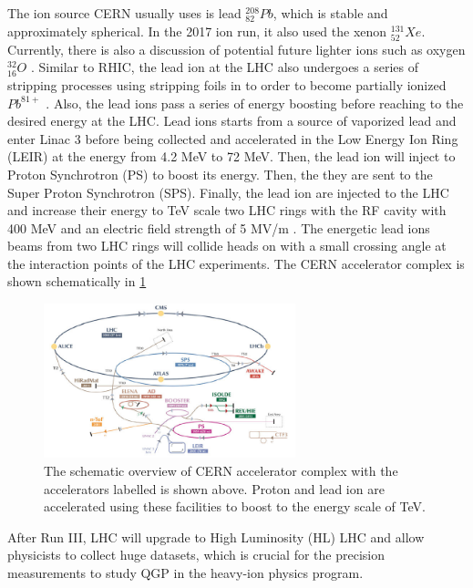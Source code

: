 The ion source CERN usually uses is lead ${}^{208}_{82} Pb$, which is stable and approximately spherical. In the 2017 ion run, it also used the xenon ${}^{131}_{52} Xe$. Currently, there is also a discussion of potential future lighter ions such as oxygen ${}^{32}_{16} O$ \cite{OORun}. Similar to RHIC, the lead ion at the LHC also undergoes a series of stripping processes using stripping foils in to order to become partially ionized $Pb^{81+}$ \cite{LHCStrip}. Also, the lead ions pass a series of energy boosting before reaching to the desired energy at the LHC. Lead ions starts from a source of vaporized lead and enter Linac 3 before being collected and accelerated in the Low Energy Ion Ring (LEIR) at the energy from 4.2 MeV to 72 MeV. Then, the lead ion will inject to Proton Synchrotron (PS) to boost its energy. Then, the they are sent to the Super Proton Synchrotron (SPS). Finally, the lead ion are injected to the LHC and increase their energy to TeV scale two LHC rings with the RF cavity with 400 MeV and an electric field strength of 5 MV/m \cite{LHCReport}. The energetic lead ions beams from two LHC rings will collide heads on with a small crossing angle at the interaction points of the LHC experiments. The CERN accelerator complex is shown schematically in \ref{CERNAccComplex} 


\begin{figure}[hbtp]
\begin{center}
\includegraphics[width=0.65\textwidth]{Figures/Chapter1/CERNAccComplex.jpg}
\caption{The schematic overview of CERN accelerator complex with the accelerators labelled is shown above. Proton and lead ion are accelerated using these facilities to boost to the energy scale of TeV.}
\label{CERNAccComplex}
\end{center}
\end{figure} 

After Run III, LHC will upgrade to High Luminosity (HL) LHC and allow physicists to collect huge datasets, which is crucial for the precision measurements to study QGP in the heavy-ion physics program.

